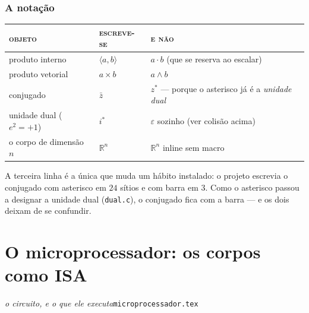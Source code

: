 \documentclass[11pt]{article}
\newcommand{\code}[1]{\texttt{\small #1}}
\newcommand{\R}{\mathbb R}
\theoremstyle{plain}
\theoremstyle{remark}
\begin{document}
\subsubsection{A notação}

\begin{center}\small
\renewcommand{\arraystretch}{1.2}
\begin{tabular}{@{}p{4.4cm}p{4.0cm}p{6.0cm}@{}}
\toprule
\textsc{objeto} & \textsc{escreve-se} & \textsc{e não} \\
\midrule
produto interno & $\langle a,b\rangle$ & $a\cdot b$ (que se reserva ao escalar) \\
produto vetorial & $a\times b$ & $a\wedge b$ \\
conjugado & $\bar z$ & $z^*$ --- porque o asterisco já é a \emph{unidade dual} \\
unidade dual ($e^2=+1$) & $i^*$ & $\varepsilon$ sozinho (ver colisão acima) \\
o corpo de dimensão $n$ & $\R^n$ & $\mathbb{R}^{n}$ inline sem macro \\
\bottomrule
\end{tabular}
\end{center}

\noindent A terceira linha é a única que muda um hábito instalado: o projeto escrevia o conjugado
com asterisco em $24$ sítios e com barra em $3$. Como o asterisco passou a designar a unidade dual
(\code{dual.c}), o conjugado fica com a barra --- e os dois deixam de se confundir.


\section{O microprocessador: os corpos como ISA}

\noindent\emph{o circuito, e o que ele executa}\hfill\code{microprocessador.tex}




\begin{abstract}
\noindent Este é o \textbf{gabarito} --- o que vai à fábrica e roda em qualquer dispositivo. E é uma
coisa só: um \textbf{circuito autossimilar}. A \emph{transformada}, a \emph{convolução}, a
\emph{deconvolução}, a \emph{inversa} não são algoritmos a implementar --- são \textbf{nomes} do que
o circuito faz, \textbf{colhidos} nos terminais. Uma peça (o \emph{gato} e o seu \emph{esquilo}, o
diodo translinear), a \textbf{borda} $|\lambda|=1$ onde tudo se sustenta, e o corpo $\mathbb{R}^n$ por
\textbf{realimentação} ($\sigma=m+\tfrac1\sigma$). O que muda de uma operação para outra é o
\emph{sinal} de uma entrada --- nada mais. Colhe-se; não se calcula.
\end{abstract}
\end{document}
